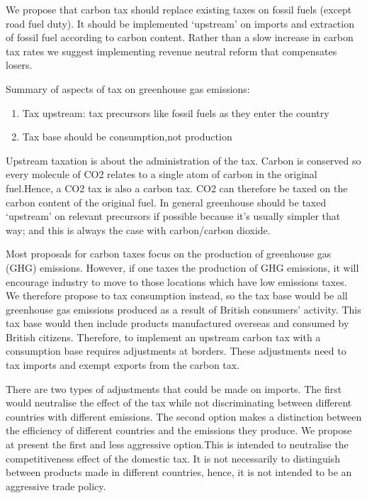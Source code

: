 \documentclass[]{tufte-handout}
\providecommand{\tightlist}{%
  \setlength{\itemsep}{0pt}\setlength{\parskip}{0pt}}
\begin{document}
We propose that carbon tax should replace existing taxes on fossil fuels
(except road fuel duty). It should be implemented `upstream' on imports
and extraction of fossil fuel according to carbon content. Rather than a
slow increase in carbon tax rates we suggest implementing revenue
neutral reform that compensates losers.

Summary of aspects of tax on greenhouse gas emissions:

\begin{enumerate}
\def\labelenumi{\arabic{enumi}.}
\tightlist
\item
  Tax upstream: tax precursors like fossil fuels as they enter the
  country
\item
  Tax base should be consumption,not production
\end{enumerate}

Upstream taxation is about the administration of the tax. Carbon is
conserved so every molecule of CO2 relates to a single atom of carbon in
the original fuel.Hence, a CO2 tax is also a carbon tax. CO2 can
therefore be taxed on the carbon content of the original fuel. In
general greenhouse should be taxed `upstream' on relevant precursors if
possible because it's usually simpler that way; and this is always the
case with carbon/carbon dioxide.

Most proposals for carbon taxes focus on the production of greenhouse
gas (GHG) emissions. However, if one taxes the production of GHG
emissions, it will encourage industry to move to those locations which
have low emissions taxes. We therefore propose to tax consumption
instead, so the tax base would be all greenhouse gas emissions produced
as a result of British consumers' activity. This tax base would then
include products manufactured overseas and consumed by British citizens.
Therefore, to implement an upstream carbon tax with a consumption base
requires adjustments at borders. These adjustments need to tax imports
and exempt exports from the carbon tax.

There are two types of adjustments that could be made on imports. The
first would neutralise the effect of the tax while not discriminating
between different countries with different emissions. The second option
makes a distinction between the efficiency of different countries and
the emissions they produce. We propose at present the first and less
aggressive option.This is intended to neutralise the competitiveness
effect of the domestic tax. It is not necessarily to distinguish between
products made in different countries, hence, it is not intended to be an
aggressive trade policy.
\end{document}
